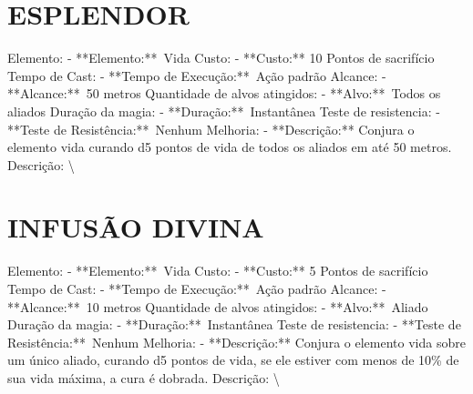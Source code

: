 \documentclass{article}%
\begin{document}
\section{ESPLENDOR}%
\label{sec:ESPLENDOR}%
Elemento: {-} **Elemento:**~Vida\newline%
Custo: {-} **Custo:** 10 Pontos de sacrifício\newline%
Tempo de Cast: {-} **Tempo de Execução:**~Ação padrão\newline%
Alcance: {-} **Alcance:**~50 metros\newline%
Quantidade de alvos atingidos: {-} **Alvo:**~Todos os aliados\newline%
Duração da magia: {-} **Duração:**~Instantânea\newline%
Teste de resistencia: {-} **Teste de Resistência:**~Nenhum\newline%
Melhoria: {-} **Descrição:** Conjura o elemento vida curando d5 pontos de vida de todos os aliados em até 50 metros.\newline%
Descrição: \textbackslash{}

%
\section{INFUSÃO DIVINA}%
\label{sec:INFUSODIVINA}%
Elemento: {-} **Elemento:**~Vida\newline%
Custo: {-} **Custo:** 5 Pontos de sacrifício\newline%
Tempo de Cast: {-} **Tempo de Execução:**~Ação padrão\newline%
Alcance: {-} **Alcance:**~10 metros\newline%
Quantidade de alvos atingidos: {-} **Alvo:**~Aliado\newline%
Duração da magia: {-} **Duração:**~Instantânea\newline%
Teste de resistencia: {-} **Teste de Resistência:**~Nenhum\newline%
Melhoria: {-} **Descrição:** Conjura o elemento vida sobre um único aliado, curando d5 pontos de vida, se ele estiver com menos de 10\% de sua vida máxima, a cura é dobrada.\newline%
Descrição: \textbackslash{}

%
\end{document}
